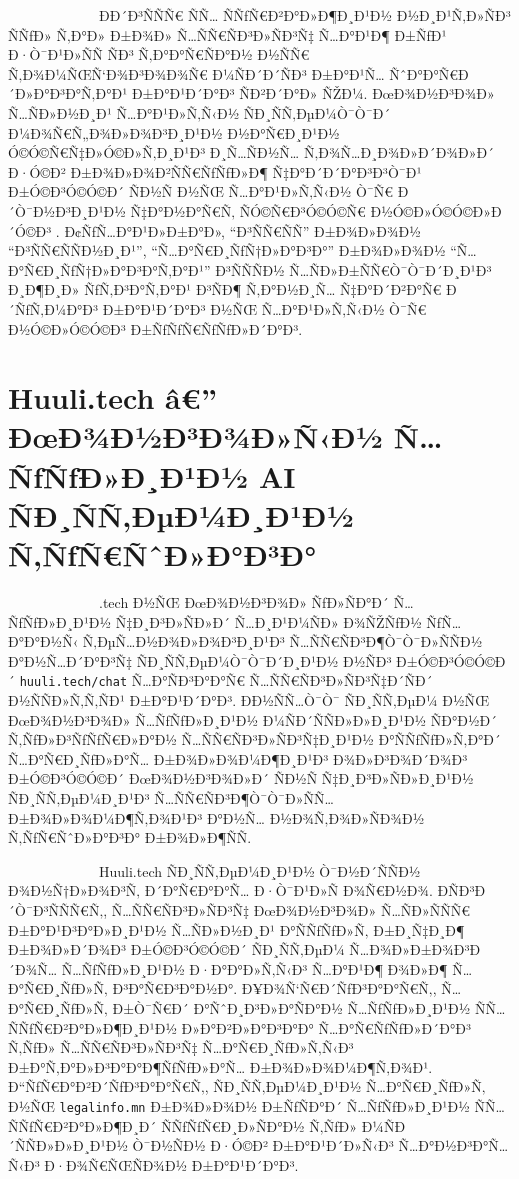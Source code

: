 \documentclass[12pt,A4]{report}
\begin{document}
\ \ \ \ \ \ \ \ \  \ \ \ \ Ð­Ð´Ð³ÑÑÑ€ ÑÑ… ÑÑƒÑ€Ð²Ð°Ð»Ð¶Ð¸Ð¹Ð½ Ð½Ð¸Ð¹Ñ‚Ð»ÑÐ³ ÑÑƒÐ» Ñ‚Ð°Ð» Ð±Ð¾Ð»
Ñ…ÑÑ€ÑÐ³Ð»ÑÐ³Ñ‡ Ñ…Ð°Ð¹Ð¶ Ð±ÑƒÐ¹ Ð·Ò¯Ð¹Ð»ÑÑ ÑÐ³ Ñ‚Ð°Ð°Ñ€ÑÐ°Ð½ Ð½ÑÑ€ Ñ‚Ð¾Ð¼ÑŒÑ‘Ð¾Ð³Ð¾Ð¾Ñ€ Ð¼ÑÐ´Ð´ÑÐ³ Ð±Ð°Ð¹Ñ…
ÑˆÐ°Ð°Ñ€Ð´Ð»Ð°Ð³Ð°Ñ‚Ð°Ð¹ Ð±Ð°Ð¹Ð´Ð°Ð³ ÑÐ²Ð´Ð°Ð» ÑŽÐ¼. ÐœÐ¾Ð½Ð³Ð¾Ð» Ñ…ÑÐ»Ð½Ð¸Ð¹ Ñ…Ð°Ð¹Ð»Ñ‚Ñ‹Ð½ ÑÐ¸ÑÑ‚ÐµÐ¼Ò¯Ò¯Ð´
Ð¼Ð¾Ñ€Ñ„Ð¾Ð»Ð¾Ð³Ð¸Ð¹Ð½ Ð½Ð°Ñ€Ð¸Ð¹Ð½ Ó©Ó©Ñ€Ñ‡Ð»Ó©Ð»Ñ‚Ð¸Ð¹Ð³ Ð¸Ñ…ÑÐ½Ñ… Ñ‚Ð¾Ñ…Ð¸Ð¾Ð»Ð´Ð¾Ð»Ð´ Ð·Ó©Ð² Ð±Ð¾Ð»Ð¾Ð²ÑÑ€ÑƒÑƒÐ»Ð¶
Ñ‡Ð°Ð´Ð´Ð°Ð³Ð³Ò¯Ð¹ Ð±Ó©Ð³Ó©Ó©Ð´ ÑÐ½Ñ Ð½ÑŒ Ñ…Ð°Ð¹Ð»Ñ‚Ñ‹Ð½ Ò¯Ñ€ Ð´Ò¯Ð½Ð³Ð¸Ð¹Ð½ Ñ‡Ð°Ð½Ð°Ñ€Ñ‚ ÑÓ©Ñ€Ð³Ó©Ó©Ñ€ Ð½Ó©Ð»Ó©Ó©Ð»Ð´Ó©Ð³
\cite{purev2008mongolian}. Ð¢ÑƒÑ…Ð°Ð¹Ð»Ð±Ð°Ð», ``Ð³ÑÑ€ÑÑ'' Ð±Ð¾Ð»Ð¾Ð½ ``Ð³ÑÑ€ÑÑÐ½Ð¸Ð¹'',
``Ñ…Ð°Ñ€Ð¸ÑƒÑ†Ð»Ð°Ð³Ð°'' Ð±Ð¾Ð»Ð¾Ð½ ``Ñ…Ð°Ñ€Ð¸ÑƒÑ†Ð»Ð°Ð³Ð°Ñ‚Ð°Ð¹'' Ð³ÑÑÑÐ½ Ñ…ÑÐ»Ð±ÑÑ€Ò¯Ò¯Ð´Ð¸Ð¹Ð³ Ð¸Ð¶Ð¸Ð» ÑƒÑ‚Ð³Ð°Ñ‚Ð°Ð¹
Ð³ÑÐ¶ Ñ‚Ð°Ð½Ð¸Ñ… Ñ‡Ð°Ð´Ð²Ð°Ñ€ Ð´ÑƒÑ‚Ð¼Ð°Ð³ Ð±Ð°Ð¹Ð´Ð°Ð³ Ð½ÑŒ Ñ…Ð°Ð¹Ð»Ñ‚Ñ‹Ð½ Ò¯Ñ€ Ð½Ó©Ð»Ó©Ó©Ð³ Ð±ÑƒÑƒÑ€ÑƒÑƒÐ»Ð´Ð°Ð³.

\section{Huuli.tech â€” ÐœÐ¾Ð½Ð³Ð¾Ð»Ñ‹Ð½ Ñ…ÑƒÑƒÐ»Ð¸Ð¹Ð½ AI ÑÐ¸ÑÑ‚ÐµÐ¼Ð¸Ð¹Ð½ Ñ‚ÑƒÑ€ÑˆÐ»Ð°Ð³Ð°}

\ \ \ \ \ \ \ \ \  \ \ \ \ \Huuli.tech Ð½ÑŒ ÐœÐ¾Ð½Ð³Ð¾Ð» ÑƒÐ»ÑÐ°Ð´ Ñ…ÑƒÑƒÐ»Ð¸Ð¹Ð½
Ñ‡Ð¸Ð³Ð»ÑÐ»Ð´ Ñ…Ð¸Ð¹Ð¼ÑÐ» Ð¾ÑŽÑƒÐ½ ÑƒÑ…Ð°Ð°Ð½Ñ‹ Ñ‚ÐµÑ…Ð½Ð¾Ð»Ð¾Ð³Ð¸Ð¹Ð³ Ñ…ÑÑ€ÑÐ³Ð¶Ò¯Ò¯Ð»ÑÑÐ½ Ð°Ð½Ñ…Ð´Ð°Ð³Ñ‡ ÑÐ¸ÑÑ‚ÐµÐ¼Ò¯Ò¯Ð´Ð¸Ð¹Ð½
Ð½ÑÐ³ Ð±Ó©Ð³Ó©Ó©Ð´ \texttt{huuli.tech/chat} Ñ…Ð°ÑÐ³Ð°Ð°Ñ€ Ñ…ÑÑ€ÑÐ³Ð»ÑÐ³Ñ‡Ð´ÑÐ´ Ð½ÑÑÐ»Ñ‚Ñ‚ÑÐ¹ Ð±Ð°Ð¹Ð´Ð°Ð³.
Ð­Ð½ÑÑ…Ò¯Ò¯ ÑÐ¸ÑÑ‚ÐµÐ¼ Ð½ÑŒ ÐœÐ¾Ð½Ð³Ð¾Ð» Ñ…ÑƒÑƒÐ»Ð¸Ð¹Ð½ Ð¼ÑÐ´ÑÑÐ»Ð»Ð¸Ð¹Ð½ ÑÐ°Ð½Ð´ Ñ‚ÑƒÐ»Ð³ÑƒÑƒÑ€Ð»Ð°Ð½ Ñ…ÑÑ€ÑÐ³Ð»ÑÐ³Ñ‡Ð¸Ð¹Ð½
Ð°ÑÑƒÑƒÐ»Ñ‚Ð°Ð´ Ñ…Ð°Ñ€Ð¸ÑƒÐ»Ð°Ñ… Ð±Ð¾Ð»Ð¾Ð¼Ð¶Ð¸Ð¹Ð³ Ð¾Ð»Ð³Ð¾Ð´Ð¾Ð³ Ð±Ó©Ð³Ó©Ó©Ð´ ÐœÐ¾Ð½Ð³Ð¾Ð»Ð´ ÑÐ½Ñ Ñ‡Ð¸Ð³Ð»ÑÐ»Ð¸Ð¹Ð½
ÑÐ¸ÑÑ‚ÐµÐ¼Ð¸Ð¹Ð³ Ñ…ÑÑ€ÑÐ³Ð¶Ò¯Ò¯Ð»ÑÑ… Ð±Ð¾Ð»Ð¾Ð¼Ð¶Ñ‚Ð¾Ð¹Ð³ Ð°Ð½Ñ… Ð½Ð¾Ñ‚Ð¾Ð»ÑÐ¾Ð½ Ñ‚ÑƒÑ€ÑˆÐ»Ð°Ð³Ð° Ð±Ð¾Ð»Ð¶ÑÑ.

\ \ \ \ \ \ \ \ \  \ \ \ \ Huuli.tech ÑÐ¸ÑÑ‚ÐµÐ¼Ð¸Ð¹Ð½ Ò¯Ð½Ð´ÑÑÐ½ Ð¾Ð½Ñ†Ð»Ð¾Ð³Ñ‚ Ð´Ð°Ñ€Ð°Ð°Ñ…
Ð·Ò¯Ð¹Ð»Ñ Ð¾Ñ€Ð½Ð¾. ÐÑÐ³Ð´Ò¯Ð³ÑÑÑ€Ñ‚, Ñ…ÑÑ€ÑÐ³Ð»ÑÐ³Ñ‡ ÐœÐ¾Ð½Ð³Ð¾Ð» Ñ…ÑÐ»ÑÑÑ€ Ð±Ð°Ð¹Ð³Ð°Ð»Ð¸Ð¹Ð½ Ñ…ÑÐ»Ð½Ð¸Ð¹
Ð°ÑÑƒÑƒÐ»Ñ‚ Ð±Ð¸Ñ‡Ð¸Ð¶ Ð±Ð¾Ð»Ð´Ð¾Ð³ Ð±Ó©Ð³Ó©Ó©Ð´ ÑÐ¸ÑÑ‚ÐµÐ¼ Ñ…Ð¾Ð»Ð±Ð¾Ð³Ð´Ð¾Ñ… Ñ…ÑƒÑƒÐ»Ð¸Ð¹Ð½ Ð·Ð°Ð°Ð»Ñ‚Ñ‹Ð³ Ñ…Ð°Ð¹Ð¶ Ð¾Ð»Ð¶
Ñ…Ð°Ñ€Ð¸ÑƒÐ»Ñ‚ Ð³Ð°Ñ€Ð³Ð°Ð½Ð°. Ð¥Ð¾Ñ‘Ñ€Ð´ÑƒÐ³Ð°Ð°Ñ€Ñ‚, Ñ…Ð°Ñ€Ð¸ÑƒÐ»Ñ‚ Ð±Ò¯Ñ€Ð´ Ð°ÑˆÐ¸Ð³Ð»Ð°ÑÐ°Ð½ Ñ…ÑƒÑƒÐ»Ð¸Ð¹Ð½ ÑÑ…
ÑÑƒÑ€Ð²Ð°Ð»Ð¶Ð¸Ð¹Ð½ Ð»Ð°Ð²Ð»Ð°Ð³Ð°Ð° Ñ…Ð°Ñ€ÑƒÑƒÐ»Ð´Ð°Ð³ Ñ‚ÑƒÐ» Ñ…ÑÑ€ÑÐ³Ð»ÑÐ³Ñ‡ Ñ…Ð°Ñ€Ð¸ÑƒÐ»Ñ‚Ñ‹Ð³ Ð±Ð°Ñ‚Ð°Ð»Ð³Ð°Ð°Ð¶ÑƒÑƒÐ»Ð°Ñ…
Ð±Ð¾Ð»Ð¾Ð¼Ð¶Ñ‚Ð¾Ð¹. Ð“ÑƒÑ€Ð°Ð²Ð´ÑƒÐ³Ð°Ð°Ñ€Ñ‚, ÑÐ¸ÑÑ‚ÐµÐ¼Ð¸Ð¹Ð½ Ñ…Ð°Ñ€Ð¸ÑƒÐ»Ñ‚ Ð½ÑŒ \texttt{legalinfo.mn}
Ð±Ð¾Ð»Ð¾Ð½ Ð±ÑƒÑÐ°Ð´ Ñ…ÑƒÑƒÐ»Ð¸Ð¹Ð½ ÑÑ… ÑÑƒÑ€Ð²Ð°Ð»Ð¶Ð¸Ð´ ÑÑƒÑƒÑ€Ð¸Ð»ÑÐ°Ð½ Ñ‚ÑƒÐ» Ð¼ÑÐ´ÑÑÐ»Ð»Ð¸Ð¹Ð½ Ò¯Ð½ÑÐ½ Ð·Ó©Ð²
Ð±Ð°Ð¹Ð´Ð»Ñ‹Ð³ Ñ…Ð°Ð½Ð³Ð°Ñ…Ñ‹Ð³ Ð·Ð¾Ñ€ÑŒÑÐ¾Ð½ Ð±Ð°Ð¹Ð´Ð°Ð³.
\end{document}
